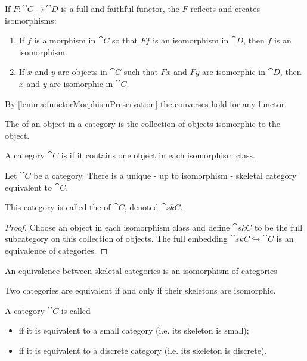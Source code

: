 \begin{lemma} \label{lemma:isomorphismCreationReflection}
If $F:\cat{C}\to\cat{D}$ is a full and faithful functor, the $F$  reflects and creates isomorphisms:
\begin{enumerate}
\item If $f$ is a morphism in $\cat{C}$ so that $Ff$ is an isomorphism in $\cat{D}$, then $f$ is an isomorphism.
\item If $x$ and $y$ are objects in $\cat{C}$ such that $Fx$ and $Fy$ are isomorphic in $\cat{D}$, then $x$ and $y$ are isomorphic in $\cat{C}$.
\end{enumerate}
\end{lemma}
By \ref{lemma:functorMorphismPreservation} the converses hold for any functor.

\begin{definition}
The  of an object in a category is the collection of objects isomorphic to the object.

A category $\cat{C}$ is  if it contains one object in each isomorphism class.
\end{definition}
\begin{lemma}
Let $\cat{C}$ be a category.
There is a unique - up to isomorphism - skeletal category equivalent to $\cat{C}$.
\end{lemma}
This category is called the  of $\cat{C}$, denoted $\cat{skC}$.
\begin{proof}
Choose an object in each isomorphism class and define $\cat{skC}$ to be the full subcategory on this collection of objects. The full embedding $\cat{skC} \hookrightarrow \cat{C}$ is an equivalence of categories.
\end{proof}

\begin{lemma}
An equivalence between skeletal categories is an isomorphism of categories
\end{lemma}
\begin{corollary}
Two categories are equivalent \textup{if and only if} their skeletons are isomorphic.
\end{corollary}

\begin{definition}
A category $\cat{C}$ is called
\begin{itemize}
\item {} if it is equivalent to a small category (i.e. its skeleton is small);
\item {} if it is equivalent to a discrete category (i.e. its skeleton is discrete).
\end{itemize}
\end{definition}

